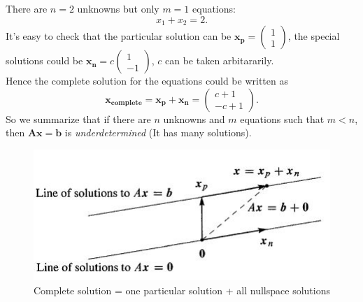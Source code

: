 \begin{example}
There are $n=2$ unknowns but only $m=1$ equations:
\[
x_1+x_2 = 2.
\]
It's easy to check that the particular solution can be $\bm{x_p} = \begin{pmatrix}
1\\1
\end{pmatrix}$, the special solutions could be $\bm{x_n} = c\begin{pmatrix}
1\\-1
\end{pmatrix}$, $c$ can be taken arbitararily.\\ Hence the complete solution for the equations could be written as \[\bm{x_{complete}} = \bm{x_p}+\bm{x_n} = \begin{pmatrix}
c+1\\-c+1
\end{pmatrix}.\]
So we summarize that if there are $n$ unknowns and $m$ equations such that $m<n$, then $\bm{Ax} = \bm b$ is \emph{underdetermined} (It has many solutions).
\begin{figure}[H]
\centering
\includegraphics{week2/complete.jpg}
\caption{Complete solution = one particular solution + all nullspace solutions}
\end{figure}
\end{example}
